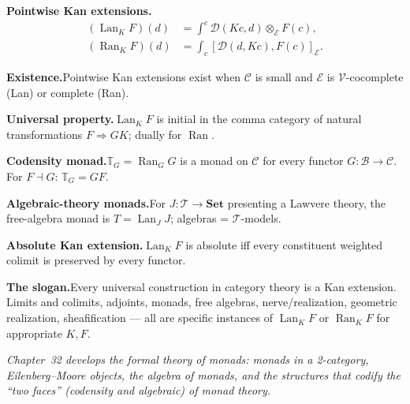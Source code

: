 \begin{formalrestatement}
\textbf{Pointwise Kan extensions.}\quad
\begin{align*}
  (\operatorname{Lan}_K F)(d) &= \int^c \mathcal{D}(K c, d) \otimes_\mathcal{E} F(c), \\
  (\operatorname{Ran}_K F)(d) &= \int_c [\mathcal{D}(d, K c), F(c)]_\mathcal{E}.
\end{align*}

\medskip
\textbf{Existence.}\quad Pointwise Kan extensions exist when $\mathcal{C}$
is small and $\mathcal{E}$ is $\mathcal{V}$-cocomplete (Lan) or complete (Ran).

\medskip
\textbf{Universal property.}\quad $\operatorname{Lan}_K F$ is initial in the
comma category of natural transformations $F \Rightarrow G K$; dually for
$\operatorname{Ran}$.

\medskip
\textbf{Codensity monad.}\quad $\mathbb{T}_G = \operatorname{Ran}_G G$ is a
monad on $\mathcal{C}$ for every functor $G : \mathcal{B} \to \mathcal{C}$.
For $F \dashv G$: $\mathbb{T}_G = G F$.

\medskip
\textbf{Algebraic-theory monads.}\quad For $J : \mathcal{T} \to \mathbf{Set}$
presenting a Lawvere theory, the free-algebra monad is $T = \operatorname{Lan}_J J$;
algebras = $\mathcal{T}$-models.

\medskip
\textbf{Absolute Kan extension.}\quad $\operatorname{Lan}_K F$ is absolute
iff every constituent weighted colimit is preserved by every functor.

\medskip
\textbf{The slogan.}\quad Every universal construction in category theory is
a Kan extension. Limits and colimits, adjoints, monads, free algebras,
nerve/realization, geometric realization, sheafification --- all are
specific instances of $\operatorname{Lan}_K F$ or $\operatorname{Ran}_K F$
for appropriate $K, F$.

\medskip
\noindent\textit{Chapter~32 develops the \emph{formal theory of monads}:
monads in a 2-category, Eilenberg--Moore objects, the algebra of monads,
and the structures that codify the ``two faces'' (codensity and algebraic)
of monad theory.}
\end{formalrestatement}
